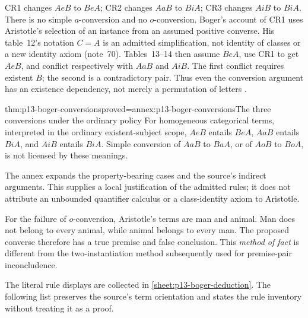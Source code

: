 CR1 changes \(AeB\) to \(BeA\); CR2 changes \(AaB\) to \(BiA\);
CR3 changes \(AiB\) to \(BiA\). There is no simple \(a\)-conversion and
no \(o\)-conversion. Boger's account of CR1 uses Aristotle's selection of an
instance from an assumed positive converse. His table~12's notation \(C=A\)
is an admitted simplification, not identity of classes or a new identity axiom
(note~70). Tables~13--14 then assume \(BeA\), use CR1 to get \(AeB\), and
conflict respectively with \(AaB\) and \(AiB\). The first conflict requires
existent \(B\); the second is a contradictory pair. Thus even the conversion
argument has an existence dependency, not merely a permutation of letters
\parencite[pp.~180--183]{Boger2004UnderlyingLogic}.

\begin{hblemma}{thm:p13-boger-conversions}{proved=annex:p13-boger-conversions}{The three conversions under the ordinary policy}
For homogeneous categorical terms, interpreted in the ordinary existent-subject
scope, \(AeB\) entails \(BeA\), \(AaB\) entails \(BiA\), and \(AiB\)
entails \(BiA\). Simple conversion of \(AaB\) to \(BaA\), or of \(AoB\)
to \(BoA\), is not licensed by these meanings.
\end{hblemma}

The annex expands the property-bearing cases and the source's indirect
arguments. This supplies a local justification of the admitted rules; it
does not attribute an unbounded quantifier calculus or a class-identity
axiom to Aristotle.

For the failure of \(o\)-conversion, Aristotle's terms are man and animal.
Man does not belong to every animal, while animal belongs to every man.
The proposed converse therefore has a true premise and false conclusion.
This \emph{method of fact} is different from the two-instantiation method
subsequently used for premise-pair inconcludence.

The literal rule displays are collected in
\cref{sheet:p13-boger-deduction}. The following list preserves the source's
term orientation and states the rule inventory without treating it as a proof.

